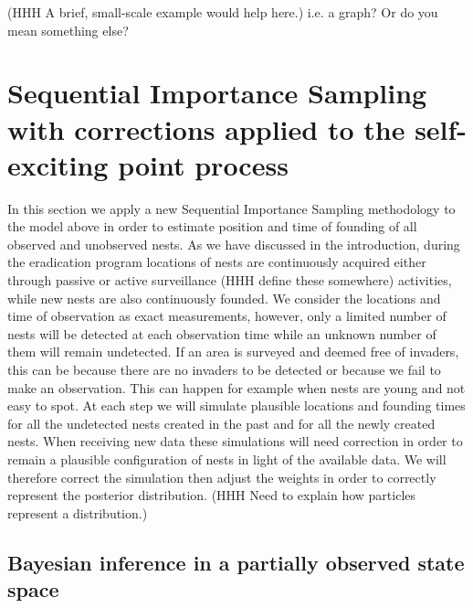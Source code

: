 \documentclass{article}
\begin{document}
(HHH A brief, small-scale example would help here.) {\color{red} i.e. a graph? Or do you mean something else?}






\section{Sequential Importance Sampling with corrections applied to the self-exciting point process} \label{sec:SISMethod}

In this section we apply a new Sequential Importance Sampling methodology to the model above in order to estimate position and time of founding of all observed and unobserved nests. As we have discussed in the introduction, during the eradication program locations of nests are continuously acquired either through passive or active surveillance (HHH define these somewhere) activities, while new nests are also continuously founded. We consider the locations and time of observation as exact measurements, however, only a limited number of nests will be detected at each observation time while an unknown number of them will remain undetected. If an area is surveyed and deemed free of invaders, this can be because there are no invaders to be detected or because we fail to make an observation. This can happen for example when nests are young and not easy to spot. At each step we will simulate plausible locations and founding times for all the undetected nests created in the past and for all the newly created nests. When receiving new data these simulations will need correction in order to remain a plausible configuration of nests in light of the available data. We will therefore correct the simulation then adjust the weights in order to correctly represent the posterior distribution. (HHH Need to explain how particles represent a distribution.)

\subsection{Bayesian inference in a partially observed state space} \label{subsec:POS}
\end{document}
